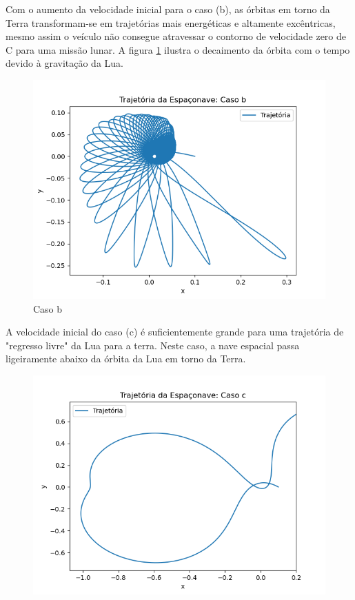 \par Com o aumento da velocidade inicial para o caso (b), as órbitas em torno da Terra transformam-se em trajetórias mais energéticas e altamente excêntricas, mesmo assim o veículo  não consegue atravessar o contorno de velocidade zero de C para uma missão lunar. A figura \ref{fig: casobbb} ilustra
o decaimento da órbita com o tempo devido à gravitação da Lua.

\begin{figure}[H]
\centering
\caption{Caso b}
\label{fig: casobbb}
\includegraphics[width=1\textwidth]{figuras/Resultados/7.3/73casob.png}
\end{figure}

\par A velocidade inicial do caso (c) é suficientemente grande para uma trajetória de "regresso livre" da Lua para a terra. Neste caso, a nave espacial passa ligeiramente abaixo da órbita da Lua em torno da Terra.

\begin{figure}[H]
\centering
\caption{}
\label{fig: caso c }
\includegraphics[width=1\textwidth]{figuras/Resultados/7.3/73casoc.png}
\end{figure}

